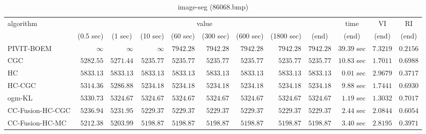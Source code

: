 \begin{table}[H]
\scriptsize
\centering
\caption{image-seg (86068.bmp)}
\label{tab:anytimetable-image-seg-86068.bmp}
\begin{tabular}{lrrrrrrrrrrr}
\toprule
           algorithm &                                   \multicolumn{8}{c}{value} & \multicolumn{1}{c}{time}    & \multicolumn{1}{c}{VI}  & \multicolumn{1}{c}{RI} \\  
\cmidrule(lr){2-9}\cmidrule(lr){10-10} \cmidrule(lr){11-11} \cmidrule(lr){12-12}   
                     & \multicolumn{1}{c}{(0.5 sec)} & \multicolumn{1}{c}{(1 sec)} & \multicolumn{1}{c}{(10 sec)} & \multicolumn{1}{c}{(60 sec)} & \multicolumn{1}{c}{(300 sec)} & \multicolumn{1}{c}{(600 sec)} & \multicolumn{1}{c}{(1800 sec)} & \multicolumn{1}{c}{(end)} & \multicolumn{1}{c}{(end)}    & \multicolumn{1}{c}{(end)}   & \multicolumn{1}{c}{(end)}  \\ \midrule 
          PIVIT-BOEM & $\infty$ & $\infty$ & $\infty$ & $      7942.28$ & $      7942.28$ & $      7942.28$ & $      7942.28$ & $      7942.28$ & $        39.39$ sec    & $       7.3219$  & $       0.2156$ \\ 
                 CGC & $      5282.55$ & $      5271.44$ & $      5235.77$ & $      5235.77$ & $      5235.77$ & $      5235.77$ & $      5235.77$ & $      5235.77$ & $        10.83$ sec    & $       1.7011$  & $       0.6988$ \\ 
                  HC & $      5833.13$ & $      5833.13$ & $      5833.13$ & $      5833.13$ & $      5833.13$ & $      5833.13$ & $      5833.13$ & $      5833.13$ & $         0.01$ sec    & $       2.9679$  & $       0.3717$ \\ 
              HC-CGC & $      5314.36$ & $      5286.88$ & $      5234.18$ & $      5234.18$ & $      5234.18$ & $      5234.18$ & $      5234.18$ & $      5234.18$ & $         9.88$ sec    & $       1.7441$  & $       0.6930$ \\ 
              ogm-KL & $      5330.73$ & $      5324.67$ & $      5324.67$ & $      5324.67$ & $      5324.67$ & $      5324.67$ & $      5324.67$ & $      5324.67$ & $         1.19$ sec    & $       1.3032$  & $       0.7017$ \\ 
    CC-Fusion-HC-CGC & $      5236.94$ & $      5231.95$ & $      5229.37$ & $      5229.37$ & $      5229.37$ & $      5229.37$ & $      5229.37$ & $      5229.37$ & $         2.44$ sec    & $       2.0844$  & $       0.6054$ \\ 
     CC-Fusion-HC-MC & $      5212.38$ & $      5203.99$ & $      5198.87$ & $      5198.87$ & $      5198.87$ & $      5198.87$ & $      5198.87$ & $      5198.87$ & $         3.40$ sec    & $       2.8195$  & $       0.3971$ \\ 

\end{tabular}
\end{table}
